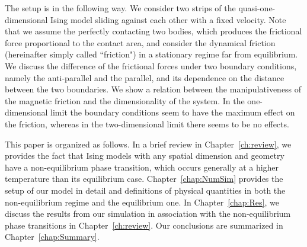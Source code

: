 The setup is in the following way. We consider two strips of the quasi-one-dimensional Ising model sliding against each other with a fixed velocity. Note that we assume the perfectly contacting two bodies, which produces the frictional force proportional to the contact area, and consider the dynamical friction (hereinafter simply called ``friction") in a stationary regime far from equilibrium. We discuss the difference of the frictional forces under two boundary conditions, namely the anti-parallel and the parallel, and its dependence on the distance between the two boundaries. We show a relation between the manipulativeness of the magnetic friction  and the dimensionality of the system. In the one-dimensional limit the boundary conditions seem to have the maximum effect on the friction, whereas in the two-dimensional limit there seems to be no effects.

This paper is organized as follows. In a brief review in Chapter~\ref{ch:review}, we provides the fact that Ising models with any spatial dimension and geometry have a non-equilibrium phase transition, which occurs generally at a higher temperature than its equilibrium case. Chapter~\ref{chap:NumSim} provides the setup of our model in detail and definitions of physical quantities in both the non-equilibrium regime and the equilibrium one. In Chapter~\ref{chap:Res}, we discuss the results from our simulation in association with the non-equilibrium phase transitions in Chapter~\ref{ch:review}. Our conclusions are summarized in Chapter~\ref{chap:Summary}.
 

